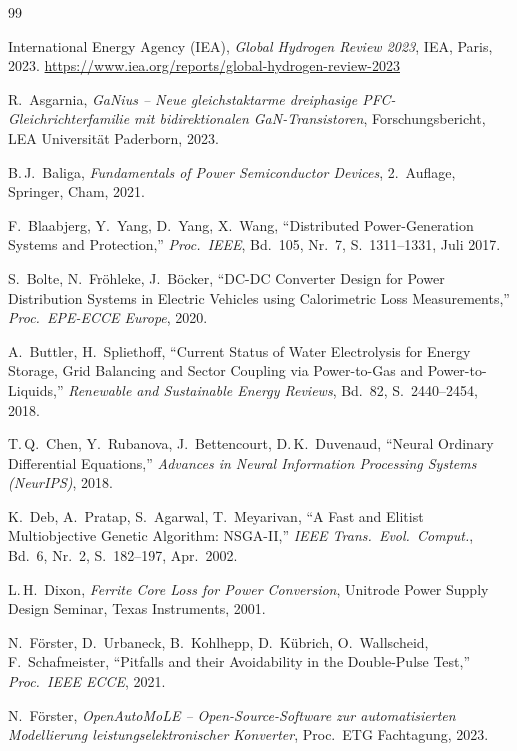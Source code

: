 ﻿\documentclass[a4paper,12pt,openany,oneside]{book}
\theoremstyle{definition}
\begin{document}
\begin{thebibliography}{99}

International Energy Agency (IEA),
\emph{Global Hydrogen Review 2023},
IEA, Paris, 2023. \url{https://www.iea.org/reports/global-hydrogen-review-2023}

R.~Asgarnia,
\emph{GaNius -- Neue gleichstaktarme dreiphasige PFC-Gleichrichterfamilie
mit bidirektionalen GaN-Transistoren},
Forschungsbericht, LEA Universit\"at Paderborn, 2023.

B.\,J.~Baliga,
\emph{Fundamentals of Power Semiconductor Devices}, 2.~Auflage,
Springer, Cham, 2021.

F.~Blaabjerg, Y.~Yang, D.~Yang, X.~Wang,
``Distributed Power-Generation Systems and Protection,''
\emph{Proc.\ IEEE}, Bd.~105, Nr.~7, S.~1311--1331, Juli 2017.

S.~Bolte, N.~Fr\"ohleke, J.~B\"ocker,
``DC-DC Converter Design for Power Distribution Systems in Electric Vehicles
using Calorimetric Loss Measurements,''
\emph{Proc.\ EPE-ECCE Europe}, 2020.

A.~Buttler, H.~Spliethoff,
``Current Status of Water Electrolysis for Energy Storage, Grid Balancing
and Sector Coupling via Power-to-Gas and Power-to-Liquids,''
\emph{Renewable and Sustainable Energy Reviews}, Bd.~82,
S.~2440--2454, 2018.

T.\,Q.~Chen, Y.~Rubanova, J.~Bettencourt, D.\,K.~Duvenaud,
``Neural Ordinary Differential Equations,''
\emph{Advances in Neural Information Processing Systems (NeurIPS)}, 2018.

K.~Deb, A.~Pratap, S.~Agarwal, T.~Meyarivan,
``A Fast and Elitist Multiobjective Genetic Algorithm: NSGA-II,''
\emph{IEEE Trans.\ Evol.\ Comput.}, Bd.~6, Nr.~2, S.~182--197, Apr.~2002.

L.\,H.~Dixon,
\emph{Ferrite Core Loss for Power Conversion},
Unitrode Power Supply Design Seminar, Texas Instruments, 2001.

N.~F\"orster, D.~Urbaneck, B.~Kohlhepp, D.~K\"ubrich, O.~Wallscheid, F.~Schafmeister,
``Pitfalls and their Avoidability in the Double-Pulse Test,''
\emph{Proc.\ IEEE ECCE}, 2021.

N.~F\"orster,
\emph{OpenAutoMoLE -- Open-Source-Software zur automatisierten Modellierung
leistungselektronischer Konverter},
Proc.\ ETG Fachtagung, 2023.


\end{thebibliography}
\end{document}
